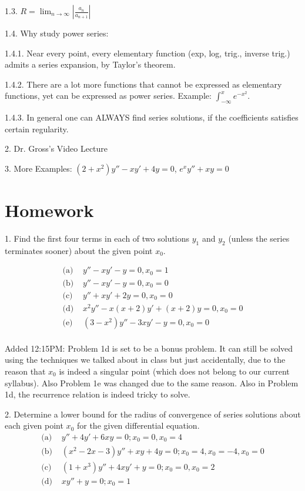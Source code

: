 \documentclass[11pt]{article}
\begin{document}
1.3. $R = \lim_{n\to \infty} \left|\frac {a_n}{a_{n+1}}\right|$

1.4. Why study power series:

1.4.1. Near every point, every elementary function (exp, log, trig., inverse trig.) admits a series expansion, by Taylor's theorem.

1.4.2. There are a lot more functions that cannot be expressed as elementary functions, yet can be expressed as power series. Example: $\int_{-\infty}^x e^{-x^2}$. 

1.4.3. In general one can ALWAYS find series solutions, if the coefficients satisfies certain regularity. 

2. Dr. Gross's Video Lecture

3. More Examples: $(2+x^2)y'' - xy' + 4y = 0$, $e^xy''+ xy = 0$

\newpage

\section*{Homework}

1. Find the first four terms in each of two solutions $y_1$ and $y_2$ (unless the series terminates
sooner) about the given point $x_0$.

$$
\begin{aligned}
\text{(a)  }& y'' - xy' - y = 0, x_0 = 1\\
\text{(b)  }& y'' - xy' - y = 0, x_0 = 0\\
\text{(c)  }& y'' + xy' + 2y = 0, x_0 = 0\\
\text{(d)  }& x^2 y'' - x(x+2)y' + (x+2)y = 0, x_0 = 0\\
\text{(e)  }& (3-x^2) y'' - 3x y' - y = 0, x_0 = 0\\
\end{aligned}
$$

Added 12:15PM: Problem 1d is set to be a bonus problem. It can still be solved using the techniques we talked about in class but just accidentally, due to the reason that $x_0$ is indeed a singular point (which does not belong to our current syllabus). Also Problem 1e was changed due to the same reason. Also in Problem 1d, the recurrence relation is indeed tricky to solve. 

2. Determine a lower bound for the radius of convergence of series solutions about each given point $x_0$ for the given differential equation.
$$
\begin{aligned}
\text{(a)  }&y'' + 4y' + 6xy = 0; x_0 = 0, x_0 = 4\\
\text{(b)  }& (x^2 - 2x - 3)y'' + xy + 4y = 0; x_0 = 4, x_0 = -4, x_0 = 0\\
\text{(c)  }& (1 + x^3)y'' + 4xy' + y = 0; x_0 = 0, x_0 = 2\\
\text{(d)  }& xy'' + y = 0; x_0 = 1
\end{aligned}
$$
\end{document}
